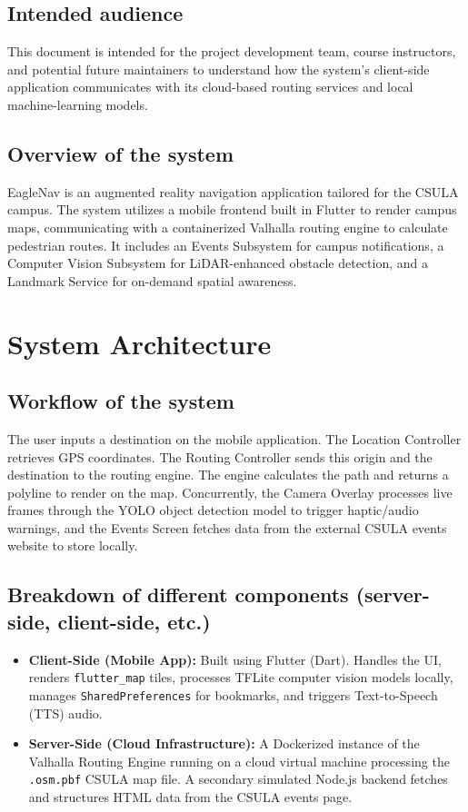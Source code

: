 \documentclass[12pt]{article}
\begin{document}
\subsection{Intended audience}
This document is intended for the project development team, course instructors, and potential future maintainers to understand how the system's client-side application communicates with its cloud-based routing services and local machine-learning models.

\subsection{Overview of the system}
EagleNav is an augmented reality navigation application tailored for the CSULA campus. The system utilizes a mobile frontend built in Flutter to render campus maps, communicating with a containerized Valhalla routing engine to calculate pedestrian routes. It includes an Events Subsystem for campus notifications, a Computer Vision Subsystem for LiDAR-enhanced obstacle detection, and a Landmark Service for on-demand spatial awareness.

\section{System Architecture}

\subsection{Workflow of the system}
The user inputs a destination on the mobile application. The Location Controller retrieves GPS coordinates. The Routing Controller sends this origin and the destination to the routing engine. The engine calculates the path and returns a polyline to render on the map. Concurrently, the Camera Overlay processes live frames through the YOLO object detection model to trigger haptic/audio warnings, and the Events Screen fetches data from the external CSULA events website to store locally.

\subsection{Breakdown of different components (server-side, client-side, etc.)}
\begin{itemize}[noitemsep]
    \item \textbf{Client-Side (Mobile App):} Built using Flutter (Dart). Handles the UI, renders \texttt{flutter\_map} tiles, processes TFLite computer vision models locally, manages \texttt{SharedPreferences} for bookmarks, and triggers Text-to-Speech (TTS) audio.
    \item \textbf{Server-Side (Cloud Infrastructure):} A Dockerized instance of the Valhalla Routing Engine running on a cloud virtual machine processing the \texttt{.osm.pbf} CSULA map file. A secondary simulated Node.js backend fetches and structures HTML data from the CSULA events page.
\end{itemize}
\end{document}
